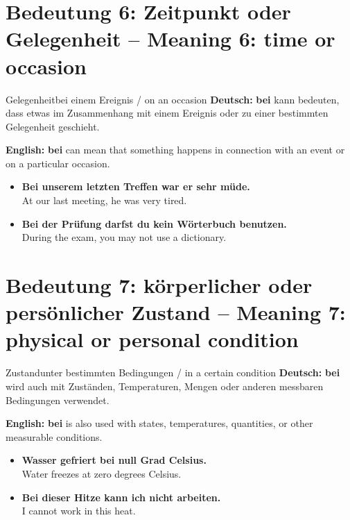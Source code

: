 \documentclass[a4paper,11pt]{article}
\newcommand{\GermanText}[1]{\textbf{Deutsch: }#1\par}
\newcommand{\EnglishText}[1]{{\small\color{SoftGray}\textbf{English: }#1\par}}
\newcommand{\ExampleItem}[2]{\item \textbf{#1}\\{\small\color{SoftGray}#2}}
\begin{document}
\section{Bedeutung 6: Zeitpunkt oder Gelegenheit -- Meaning 6: time or occasion}
\begin{grammarentry}{Gelegenheit}{bei einem Ereignis / on an occasion}
\GermanText{\textbf{bei} kann bedeuten, dass etwas im Zusammenhang mit einem Ereignis oder zu einer bestimmten Gelegenheit geschieht.}
\EnglishText{\textbf{bei} can mean that something happens in connection with an event or on a particular occasion.}
\end{grammarentry}
\begin{exbox}\begin{itemize}
\ExampleItem{Bei unserem letzten Treffen war er sehr müde.}{At our last meeting, he was very tired.}
\ExampleItem{Bei der Prüfung darfst du kein Wörterbuch benutzen.}{During the exam, you may not use a dictionary.}
\end{itemize}\end{exbox}

\section{Bedeutung 7: körperlicher oder persönlicher Zustand -- Meaning 7: physical or personal condition}
\begin{grammarentry}{Zustand}{unter bestimmten Bedingungen / in a certain condition}
\GermanText{\textbf{bei} wird auch mit Zuständen, Temperaturen, Mengen oder anderen messbaren Bedingungen verwendet.}
\EnglishText{\textbf{bei} is also used with states, temperatures, quantities, or other measurable conditions.}
\end{grammarentry}
\begin{exbox}\begin{itemize}
\ExampleItem{Wasser gefriert bei null Grad Celsius.}{Water freezes at zero degrees Celsius.}
\ExampleItem{Bei dieser Hitze kann ich nicht arbeiten.}{I cannot work in this heat.}
\end{itemize}\end{exbox}
\end{document}
